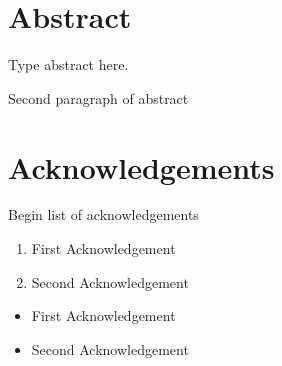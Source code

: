 \documentclass[hidelinks,12pt]{article}
\begin{document}
\section*{Abstract} %

\noindent Type abstract here. %
\par Second paragraph of abstract %

\newpage %
\section*{Acknowledgements} %

\noindent Begin list of acknowledgements
\begin{enumerate} %
    \item First Acknowledgement %
    \item Second Acknowledgement %
\end{enumerate}


\begin{itemize} %
    \item First Acknowledgement %
    \item Second Acknowledgement %
\end{itemize}

\newpage %
\tableofcontents %
\listoftables %
\listoffigures %
\end{document}
